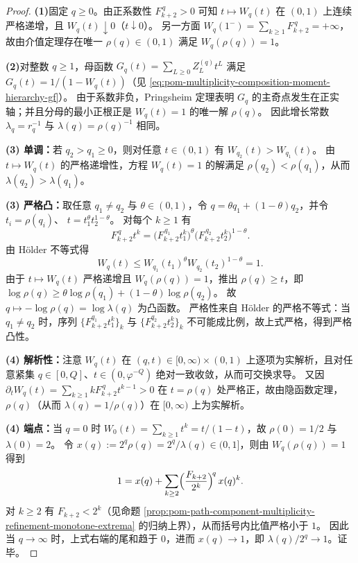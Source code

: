 \begin{proof}
\textbf{(1)}固定 \(q\ge 0\)。由正系数性 \(F_{k+2}^{\,q}>0\) 可知 \(t\mapsto W_q(t)\) 在 \((0,1)\) 上连续严格递增，且 \(W_q(t)\downarrow 0\)（\(t\downarrow 0\)）。
另一方面 \(W_q(1^-)=\sum_{k\ge 1}F_{k+2}^{\,q}=+\infty\)，故由介值定理存在唯一 \(\rho(q)\in(0,1)\) 满足 \(W_q(\rho(q))=1\)。
\par
\textbf{(2)}对整数 \(q\ge 1\)，母函数 \(G_q(t)=\sum_{L\ge 0}Z_L^{(q)}t^L\) 满足 \(G_q(t)=1/(1-W_q(t))\)（见 \eqref{eq:pom-multiplicity-composition-moment-hierarchy-gf}）。
由于系数非负，Pringsheim 定理表明 \(G_q\) 的主奇点发生在正实轴；并且分母的最小正根正是 \(W_q(t)=1\) 的唯一解 \(\rho(q)\)。
因此增长常数 \(\lambda_q=r_q^{-1}\) 与 \(\lambda(q)=\rho(q)^{-1}\) 相同。
\par
\textbf{(3) 单调：}若 \(q_2>q_1\ge 0\)，则对任意 \(t\in(0,1)\) 有 \(W_{q_2}(t)>W_{q_1}(t)\)。
由 \(t\mapsto W_q(t)\) 的严格递增性，方程 \(W_q(t)=1\) 的解满足 \(\rho(q_2)<\rho(q_1)\)，从而 \(\lambda(q_2)>\lambda(q_1)\)。
\par
\textbf{(3) 严格凸：}取任意 \(q_1\ne q_2\) 与 \(\theta\in(0,1)\)，令 \(q=\theta q_1+(1-\theta)q_2\)，并令
\(
t_i=\rho(q_i)
\)、
\(
t=t_1^\theta t_2^{1-\theta}
\)。
对每个 \(k\ge 1\) 有
\[
F_{k+2}^{\,q}t^{k}=\bigl(F_{k+2}^{\,q_1}t_1^k\bigr)^\theta\bigl(F_{k+2}^{\,q_2}t_2^k\bigr)^{1-\theta}.
\]
由 H\"older 不等式得
\[
W_q(t)\le W_{q_1}(t_1)^\theta W_{q_2}(t_2)^{1-\theta}=1.
\]
由于 \(t\mapsto W_q(t)\) 严格递增且 \(W_q(\rho(q))=1\)，推出 \(\rho(q)\ge t\)，即
\(
\log\rho(q)\ge \theta\log\rho(q_1)+(1-\theta)\log\rho(q_2)
\)。
故 \(q\mapsto -\log\rho(q)=\log\lambda(q)\) 为凸函数。
严格性来自 H\"older 的严格不等式：当 \(q_1\ne q_2\) 时，序列 \(\{F_{k+2}^{q_1}t_1^k\}_k\) 与 \(\{F_{k+2}^{q_2}t_2^k\}_k\) 不可能成比例，故上式严格，得到严格凸性。
\par
\textbf{(4) 解析性：}注意 \(W_q(t)\) 在 \((q,t)\in[0,\infty)\times(0,1)\) 上逐项为实解析，且对任意紧集 \(q\in[0,Q]\)、\(t\in(0,\varphi^{-Q})\) 绝对一致收敛，从而可交换求导。
又因
\(
\partial_t W_q(t)=\sum_{k\ge 1}kF_{k+2}^{\,q}t^{k-1}>0
\)
在 \(t=\rho(q)\) 处严格正，故由隐函数定理，\(\rho(q)\)（从而 \(\lambda(q)=1/\rho(q)\)）在 \([0,\infty)\) 上为实解析。
\par
\textbf{(4) 端点：}当 \(q=0\) 时 \(W_0(t)=\sum_{k\ge 1}t^k=t/(1-t)\)，故 \(\rho(0)=1/2\) 与 \(\lambda(0)=2\)。
令 \(x(q):=2^q\rho(q)=2^q/\lambda(q)\in(0,1]\)，则由 \(W_q(\rho(q))=1\) 得到
\[
1=x(q)+\sum_{k\ge 2}\Bigl(\frac{F_{k+2}}{2^{k}}\Bigr)^{\!q}\,x(q)^k.
\]
对 \(k\ge 2\) 有 \(F_{k+2}<2^k\)（见命题 \ref{prop:pom-path-component-multiplicity-refinement-monotone-extrema} 的归纳上界），从而括号内比值严格小于 \(1\)。
因此当 \(q\to\infty\) 时，上式右端的尾和趋于 \(0\)，进而 \(x(q)\to 1\)，即 \(\lambda(q)/2^q\to 1\)。证毕。
\end{proof}

